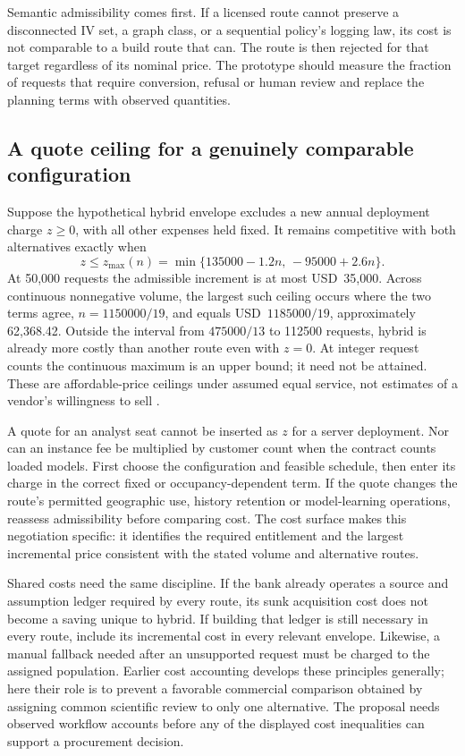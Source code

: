 Semantic admissibility comes first. If a licensed route cannot preserve a
disconnected IV set, a graph class, or a sequential policy's logging law, its
cost is not comparable to a build route that can. The route is then rejected
for that target regardless of its nominal price. The prototype should measure
the fraction of requests that require conversion, refusal or human review and
replace the planning terms with observed quantities.

\subsection{A quote ceiling for a genuinely comparable configuration}

Suppose the hypothetical hybrid envelope excludes a new annual deployment
charge $z\geq0$, with all other expenses held fixed. It remains competitive
with both alternatives exactly when
\begin{equation}
 z\leq z_{\max}(n)=\min\{135000-1.2n,\,-95000+2.6n\}.
 \label{exec17:s8-quote-ceiling}
\end{equation}
At 50,000 requests the admissible increment is at most USD~35,000. Across
continuous nonnegative volume, the largest such ceiling occurs where the two
terms agree, $n=1150000/19$, and equals USD~$1185000/19$, approximately
62,368.42. Outside the interval from $475000/13$ to 112500 requests, hybrid
is already more costly than another route even with $z=0$. At integer request
counts the continuous maximum is an upper bound; it need not be attained.
These are affordable-price ceilings under assumed equal service, not
estimates of a vendor's willingness to sell \citep{exec17_s8_examples}.

A quote for an analyst seat cannot be inserted as $z$ for a server deployment.
Nor can an instance fee be multiplied by customer count when the contract
counts loaded models. First choose the configuration and feasible schedule,
then enter its charge in the correct fixed or occupancy-dependent term.
If the quote changes the route's permitted geographic use, history retention
or model-learning operations, reassess admissibility before comparing cost.
The cost surface makes this negotiation specific: it identifies the required
entitlement and the largest incremental price consistent with the stated
volume and alternative routes.

Shared costs need the same discipline. If the bank already operates a source
and assumption ledger required by every route, its sunk acquisition cost
does not become a saving unique to hybrid. If building that ledger is still
necessary in every route, include its incremental cost in every relevant
envelope. Likewise, a manual fallback needed after an unsupported request
must be charged to the assigned population. Earlier cost accounting develops
these principles generally; here their role is to prevent a favorable
commercial comparison obtained by assigning common scientific review to only
one alternative. The proposal needs observed workflow accounts before any
of the displayed cost inequalities can support a procurement decision.

